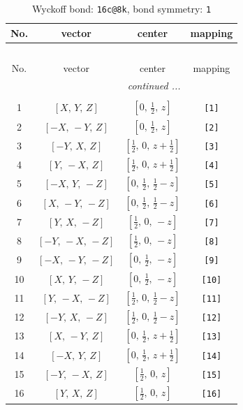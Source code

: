 \documentclass[fleqn,8pt]{jsarticle}
\begin{document}
\begin{longtable}{cccc}
\caption{Wyckoff bond: {\tt 16c@8k}, bond symmetry: {\tt 1}}
 \\
 \hline \hline
No. & vector & center & mapping \\ \hline \endfirsthead

\multicolumn{3}{l}{\tablename\ \thetable{}} \\
 \hline \hline
No. & vector & center & mapping \\ \hline \endhead

 \hline \hline
\multicolumn{3}{r}{\footnotesize\it continued ...} \\ \endfoot

 \hline \hline
\multicolumn{3}{r}{} \\ \endlastfoot

1 & $\left[ X,\, Y,\, Z \right]$ & $\left[ 0,\, \frac{1}{2},\, z \right]$ & {\tt [1]} \\ \hline
2 & $\left[ - X,\, - Y,\, Z \right]$ & $\left[ 0,\, \frac{1}{2},\, z \right]$ & {\tt [2]} \\ \hline
3 & $\left[ - Y,\, X,\, Z \right]$ & $\left[ \frac{1}{2},\, 0,\, z + \frac{1}{2} \right]$ & {\tt [3]} \\ \hline
4 & $\left[ Y,\, - X,\, Z \right]$ & $\left[ \frac{1}{2},\, 0,\, z + \frac{1}{2} \right]$ & {\tt [4]} \\ \hline
5 & $\left[ - X,\, Y,\, - Z \right]$ & $\left[ 0,\, \frac{1}{2},\, \frac{1}{2} - z \right]$ & {\tt [5]} \\ \hline
6 & $\left[ X,\, - Y,\, - Z \right]$ & $\left[ 0,\, \frac{1}{2},\, \frac{1}{2} - z \right]$ & {\tt [6]} \\ \hline
7 & $\left[ Y,\, X,\, - Z \right]$ & $\left[ \frac{1}{2},\, 0,\, - z \right]$ & {\tt [7]} \\ \hline
8 & $\left[ - Y,\, - X,\, - Z \right]$ & $\left[ \frac{1}{2},\, 0,\, - z \right]$ & {\tt [8]} \\ \hline
9 & $\left[ - X,\, - Y,\, - Z \right]$ & $\left[ 0,\, \frac{1}{2},\, - z \right]$ & {\tt [9]} \\ \hline
10 & $\left[ X,\, Y,\, - Z \right]$ & $\left[ 0,\, \frac{1}{2},\, - z \right]$ & {\tt [10]} \\ \hline
11 & $\left[ Y,\, - X,\, - Z \right]$ & $\left[ \frac{1}{2},\, 0,\, \frac{1}{2} - z \right]$ & {\tt [11]} \\ \hline
12 & $\left[ - Y,\, X,\, - Z \right]$ & $\left[ \frac{1}{2},\, 0,\, \frac{1}{2} - z \right]$ & {\tt [12]} \\ \hline
13 & $\left[ X,\, - Y,\, Z \right]$ & $\left[ 0,\, \frac{1}{2},\, z + \frac{1}{2} \right]$ & {\tt [13]} \\ \hline
14 & $\left[ - X,\, Y,\, Z \right]$ & $\left[ 0,\, \frac{1}{2},\, z + \frac{1}{2} \right]$ & {\tt [14]} \\ \hline
15 & $\left[ - Y,\, - X,\, Z \right]$ & $\left[ \frac{1}{2},\, 0,\, z \right]$ & {\tt [15]} \\ \hline
16 & $\left[ Y,\, X,\, Z \right]$ & $\left[ \frac{1}{2},\, 0,\, z \right]$ & {\tt [16]} \\
\end{longtable}
\end{document}
